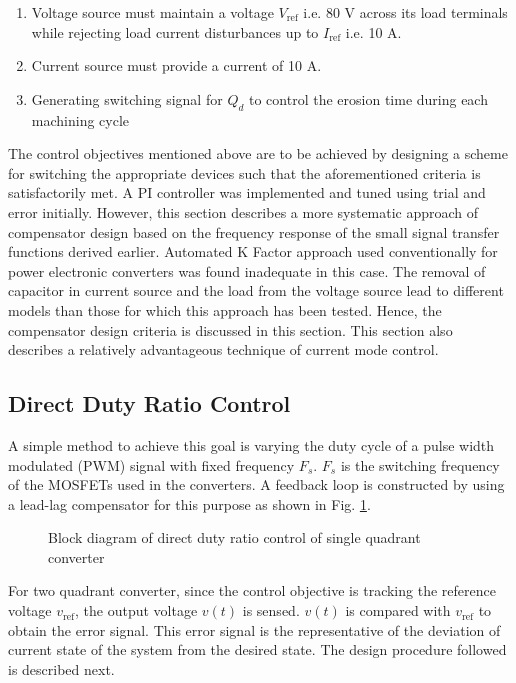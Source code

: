 \documentclass[a4paper]{IEEEtran}
\begin{document}
	\begin{enumerate}
		\item Voltage source must maintain a voltage $V_{\text{ref}}$ i.e. 80 V across its load terminals while rejecting load current disturbances up to $I_{\text{ref}}$ i.e. 10 A.
		\item Current source must provide a current of 10 A.
		\item Generating switching signal for $Q_d$ to control the erosion time during each machining cycle 
	\end{enumerate}

	The control objectives mentioned above are to be achieved by designing a scheme for switching the appropriate devices such that the aforementioned criteria is satisfactorily met. A PI controller was implemented and tuned using trial and error initially. However, this section describes a more systematic approach of compensator design based on the frequency response of the small signal transfer functions derived earlier. Automated K Factor approach \cite{muhamad2005design} used conventionally for power electronic converters was found inadequate in this case. The removal of capacitor in current source and the load from the voltage source lead to different models than those for which this approach has been tested. Hence, the compensator design criteria is discussed in this section. This section also describes a relatively advantageous technique of current mode control.

\subsection{Direct Duty Ratio Control}
	 A simple method to achieve this goal is varying the duty cycle of a pulse width modulated (PWM) signal with fixed frequency $F_s$. $F_s$ is the switching frequency of the MOSFETs used in the converters. A feedback loop is constructed by using a lead-lag compensator for this purpose as shown in Fig. \ref{fig:dirduty-1}.

	\begin{figure}
		\centering
		
		\caption{Block diagram of direct duty ratio control of single quadrant converter}
		\label{fig:dirduty-1}
	\end{figure}

	For two quadrant converter, since the control objective is tracking the reference voltage $v_{\text{ref}}$, the output voltage $v(t)$ is sensed. $v(t)$ is compared with $v_{\text{ref}}$ to obtain the error signal. This error signal is the representative of the deviation of current state of the system from the desired state. The design procedure followed is described next.
\end{document}
